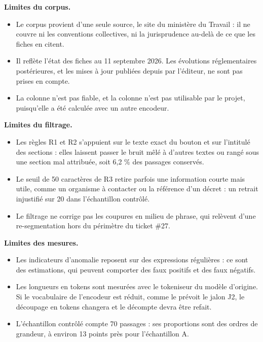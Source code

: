 \textbf{Limites du corpus.}

\begin{itemize}
\item Le corpus provient d'une seule source, le site du ministère du Travail : il ne couvre ni les
conventions collectives, ni la jurisprudence au-delà de ce que les fiches en citent.
\item Il reflète l'état des fiches au 11 septembre 2026. Les évolutions réglementaires postérieures, et
les mises à jour publiées depuis par l'éditeur, ne sont pas prises en compte.
\item La colonne  n'est pas fiable, et la colonne  n'est pas
utilisable par le projet, puisqu'elle a été calculée avec un autre encodeur.
\end{itemize}

\textbf{Limites du filtrage.}

\begin{itemize}
\item Les règles R1 et R2 s'appuient sur le texte exact du bouton et sur l'intitulé des sections : elles
laissent passer le bruit mêlé à d'autres textes ou rangé sous une section mal attribuée, soit 6,2 \% des
passages conservés.
\item Le seuil de 50 caractères de R3 retire parfois une information courte mais utile, comme un
organisme à contacter ou la référence d'un décret : un retrait injustifié sur 20 dans l'échantillon
contrôlé.
\item Le filtrage ne corrige pas les coupures en milieu de phrase, qui relèvent d'une re-segmentation
hors du périmètre du ticket \#27.
\end{itemize}

\textbf{Limites des mesures.}

\begin{itemize}
\item Les indicateurs d'anomalie reposent sur des expressions régulières : ce sont des estimations,
qui peuvent comporter des faux positifs et des faux négatifs.
\item Les longueurs en tokens sont mesurées avec le tokeniseur du modèle d'origine. Si le vocabulaire
de l'encodeur est réduit, comme le prévoit le jalon J2, le découpage en tokens changera et le décompte
devra être refait.
\item L'échantillon contrôlé compte 70 passages : ses proportions sont des ordres de grandeur, à environ
13 points près pour l'échantillon A.
\end{itemize}


